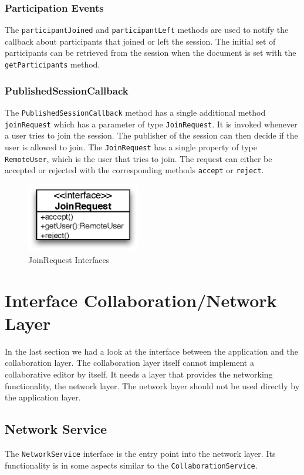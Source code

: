 \subsubsection{Participation Events}
The \texttt{participantJoined} and \texttt{participantLeft} methods are used to
notify the callback about
participants that joined or left the session. The initial set of participants
can be retrieved from the session when the document is set with
the \texttt{getParticipants} method.


\subsubsection{PublishedSessionCallback}
The \texttt{PublishedSessionCallback} method has a single additional method
\texttt{joinRequest} which has a parameter of type \texttt{JoinRequest}. It
is invoked whenever a user tries to join the session. The publisher of the
session can then decide if the user is allowed to join. The \texttt{JoinRequest}
has a single property of type \texttt{RemoteUser}, which is the user that 
tries to join. The request can either be accepted or rejected with the 
corresponding methods \texttt{accept} or \texttt{reject}.

\begin{figure}[H]
 \centering
 \includegraphics[width=4.97cm,height=3.03cm]{../images/finalreport/architecture_joinrequest_uml.eps}
 \caption{JoinRequest Interfaces}
\end{figure}



\section{Interface Collaboration/Network Layer}
In the last section we had a look at the interface between the application and
the collaboration layer. The collaboration layer itself cannot implement a
collaborative editor by itself. It needs a layer that provides the networking
functionality, the network layer. The network layer should not be used
directly by the application layer.

\subsection{Network Service}
The \texttt{NetworkService} interface is the entry point into the network layer.
Its functionality is in some aspects similar to the 
\texttt{CollaborationService}. 


